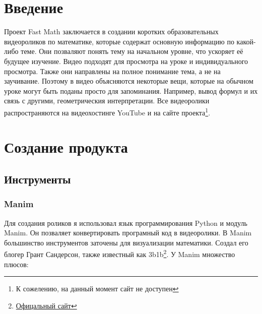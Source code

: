 \documentclass[a4paper, 14pt]{extarticle}
\begin{document}
\section{Введение}
Проект Fast Math заключается в создании коротких образовательных видеороликов по математике, которые
содержат основную информацию по какой-либо теме. Они позваляют понять
тему на начальном уровне, что ускоряет её будущее изучение.
Видео подходят для просмотра на уроке и индивидуального просмотра.
Также они направлены на полное понимание тема, а не на заучивание.
Поэтому в видео объясняются некоторые вещи,
которые на обычном уроке могут быть поданы просто для запоминания.
Например, вывод формул и их связь с другими, геометрическия интерпретации.
Все видеоролики распространяются на видеохостинге YouTube\texttrademark
и на сайте проекта\footnote{
    К сожелению, на данный момент сайт не доступен
}.

\newpage
\section{Создание продукта}

\subsection{Инструменты}

\subsubsection{Manim}
Для создания роликов я использовал язык программирования Python
и модуль Manim. Он позваляет конвертировать
програмный код в видеоролики.
В Manim большинство инструментов заточены для визуализации математики.
Создал его блогер Грант Сандерсон, также известный как 3b1b\footnote{
    \href{3blue1brown.com}{Офицальный сайт}
}.
У Manim множество плюсов:

\end{document}
